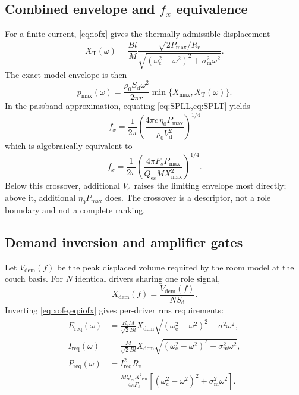 \documentclass[11pt,a4paper]{article}
\numberwithin{equation}{section}
\newcommand{\Sd}{S_{\mathrm{d}}}
\newcommand{\Xmax}{X_{\mathrm{max}}}
\newcommand{\Vd}{V_{\mathrm{d}}}
\newcommand{\Mms}{M}
\renewcommand{\Re}{R_{\mathrm{e}}}
\newcommand{\Bl}{Bl}
\newcommand{\Qes}{Q_{\mathrm{es}}}
\newcommand{\Pmax}{P_{\mathrm{max}}}
\newcommand{\wc}{\omega_{\mathrm{c}}}
\newcommand{\sm}{\sigma_{\mathrm{m}}}
\begin{document}
\subsection{Combined envelope and \texorpdfstring{$f_x$}{fx} equivalence}

For a finite current, \cref{eq:iofx} gives the thermally admissible
displacement
\begin{equation}
	X_{\mathrm T}(\omega)=
	\frac{\Bl}{\Mms}
	\frac{\sqrt{2\Pmax/\Re}}
	{\sqrt{(\wc^2-\omega^2)^2+\sm^2\omega^2}} .
	\label{eq:XT}
\end{equation}
The exact model envelope is then
\begin{equation}
	p_{\max}(\omega)=
	\frac{\rho_0\Sd\omega^2}{2\pi r}
	\min\{\Xmax,X_{\mathrm T}(\omega)\}.
	\label{eq:master}
\end{equation}
In the passband approximation, equating
\cref{eq:SPLL,eq:SPLT} yields
\begin{equation}
	\boxed{
	f_x=\frac{1}{2\pi}
	\left(
	\frac{4\pi c\,\eta_0\Pmax}{\rho_0\Vd^2}
	\right)^{1/4}}
	\label{eq:fx}
\end{equation}
which is algebraically equivalent to
\begin{equation}
	f_x=\frac{1}{2\pi}
	\left(
	\frac{4\pi F_s\Pmax}
	{\Qes\Mms\Xmax^2}
	\right)^{1/4}.
	\label{eq:fx-ts}
\end{equation}
Below this crossover, additional $\Vd$ raises the limiting envelope most
directly; above it, additional $\eta_0\Pmax$ does.  The crossover is a
descriptor, not a role boundary and not a complete ranking.

\subsection{Demand inversion and amplifier gates}
\label{sec:freq-gates}

Let $V_{\mathrm{dem}}(f)$ be the peak displaced volume required by the room
model at the couch basis.  For $N$ identical drivers sharing one role signal,
\begin{equation}
	X_{\mathrm{dem}}(f)=
	\frac{V_{\mathrm{dem}}(f)}{N\Sd}.
	\label{eq:Xdem}
\end{equation}
Inverting \cref{eq:xofe,eq:iofx} gives per-driver rms requirements:
\begin{align}
	E_{\mathrm{req}}(\omega)
	&=\frac{\Re\Mms}{\sqrt2\Bl}X_{\mathrm{dem}}
	\sqrt{(\wc^2-\omega^2)^2+\sigma^2\omega^2},
	\label{eq:Ereq}\\
	I_{\mathrm{req}}(\omega)
	&=\frac{\Mms}{\sqrt2\Bl}X_{\mathrm{dem}}
	\sqrt{(\wc^2-\omega^2)^2+\sm^2\omega^2},
	\label{eq:Ireq}\\
	P_{\mathrm{req}}(\omega)
	&=I_{\mathrm{req}}^2\Re \nonumber\\
	&=\frac{\Mms\Qes X_{\mathrm{dem}}^2}{4\pi F_s}
	\left[(\wc^2-\omega^2)^2+\sm^2\omega^2\right].
	\label{eq:Preq}
\end{align}
\end{document}
